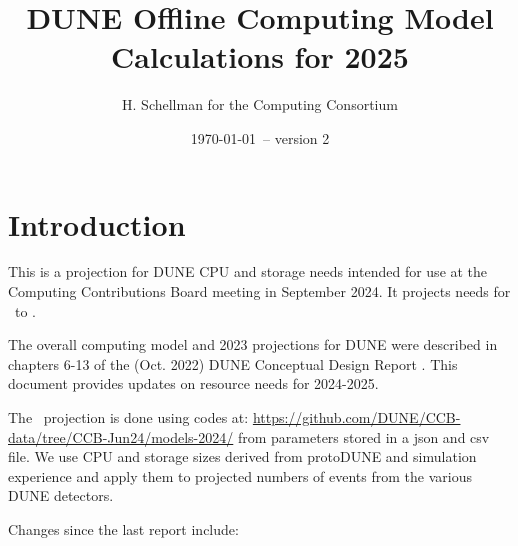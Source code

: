 \documentclass[12pt]{article}
\title{DUNE Offline Computing Model Calculations for 2025}
\author{H. Schellman for the Computing Consortium}
\date{\today\ -- version 2}
\newcommand{\csvautotabularright}[2][]{\csvloop{autotabularright={#2},#1}}
\begin{document}
\makeatletter

\maketitle



\section{Introduction}

This is a projection for DUNE CPU and storage needs intended for use at the Computing Contributions Board meeting in September 2024. It projects needs for \configRequestYear\ to \configMaxYear. 

The overall computing model  and 2023 projections for DUNE were described in chapters 6-13 of the  (Oct. 2022) DUNE Conceptual Design Report \cite{DUNE:2022fcw}.   This document provides updates on resource needs for 2024-2025. 

The \configRequestYear\ projection is done using codes at: \href{https://github.com/DUNE/CCB-data/tree/CCB-Jun24/models-2024/}{https://github.com/DUNE/CCB-data/tree/CCB-Jun24/models-2024/} from parameters stored in a json and csv file. We use CPU and storage sizes derived from protoDUNE and simulation experience and apply them to projected numbers of events from the various DUNE detectors. 







Changes since the last report \cite{CCB2024Report, CCB2024Minutes} include:
\end{document}
